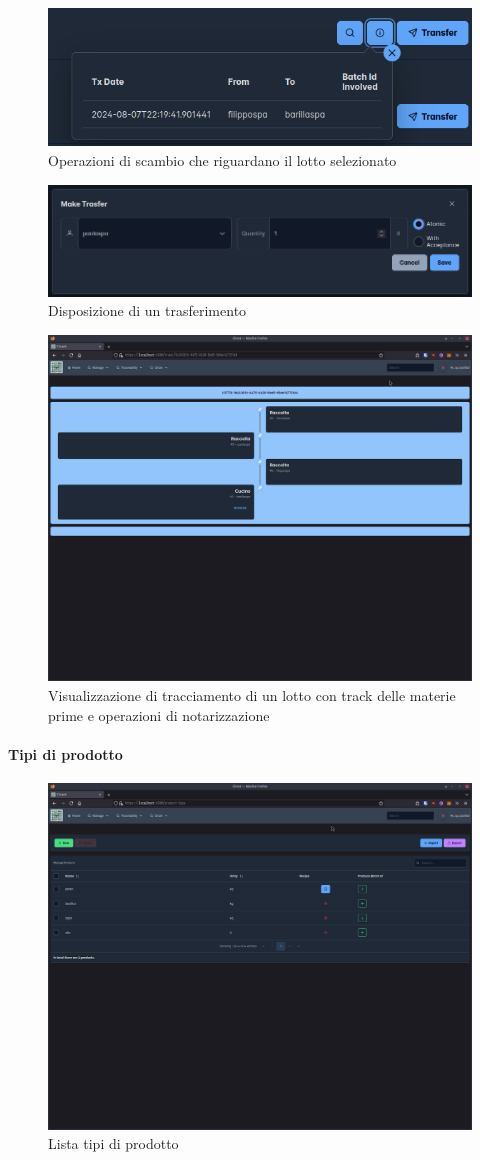 \documentclass[a4paper,11pt]{article}
\begin{document}
\begin{figure}[H]
  \centering
  \includegraphics[width=0.5\linewidth]{screenIotChain/0004.png}
  \caption{Operazioni di scambio che riguardano il lotto selezionato}
  \label{fig:screen4}
\end{figure}

\begin{figure}[H]
  \centering
  \includegraphics[width=0.5\linewidth]{screenIotChain/0006.png}
  \caption{Disposizione di un trasferimento}
  \label{fig:screen6}
\end{figure}

\begin{figure}[H]
  \centering
  \includegraphics[width=0.5\linewidth]{screenIotChain/0014.png}
  \caption{Visualizzazione di tracciamento di un lotto con track delle materie prime e operazioni di notarizzazione}
  \label{fig:screen14}
\end{figure}

\paragraph{Tipi di prodotto}


\begin{figure}[H]
  \centering
  \includegraphics[width=0.5\linewidth]{screenIotChain/0007.png}
  \caption{Lista tipi di prodotto}
  \label{fig:screen7}
\end{figure}
\end{document}
